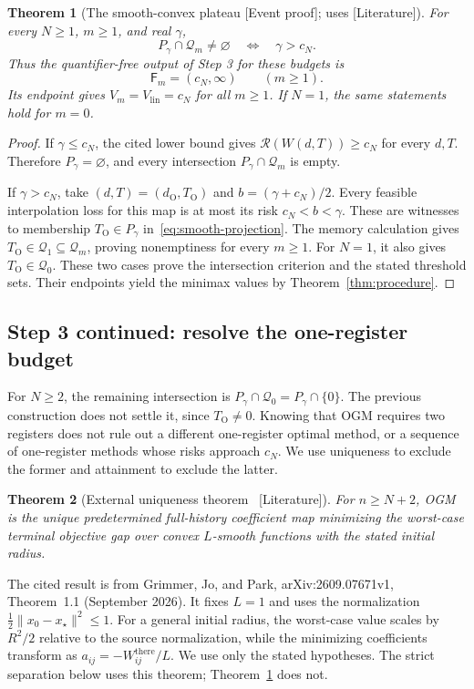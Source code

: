 \documentclass[11pt]{article}
\newcommand{\supportlabel}[1]{\textcolor{blue!60!black}{\small\textsf{[#1]}}}
\newcommand{\eventproof}{\supportlabel{Event proof}}
\newcommand{\literature}{\supportlabel{Literature}}
\numberwithin{equation}{section}
\newtheorem{theorem}{Theorem}[section]
\theoremstyle{definition}
\newcommand{\Q}{\mathcal Q}
\newcommand{\risk}{\mathcal R}
\begin{document}
\begin{theorem}[The smooth-convex plateau \eventproof; uses \literature]\label{thm:smooth-plateau}
For every $N\ge1$, $m\ge1$, and real $\gamma$,
\begin{equation}
 P_\gamma\cap\Q_m\ne\varnothing\quad\Longleftrightarrow\quad\gamma>c_N.
 \label{eq:smooth-intersections}
\end{equation}
Thus the quantifier-free output of Step 3 for these budgets is
\begin{equation}
 \mathsf F_m=(c_N,\infty)\qquad(m\ge1).
 \label{eq:smooth-thresholds}
\end{equation}
Its endpoint gives $V_m=V_{\mathrm{lin}}=c_N$ for all $m\ge1$. If $N=1$, the same statements hold for $m=0$.
\end{theorem}
\begin{proof}
If $\gamma\le c_N$, the cited lower bound gives $\risk(W(d,T))\ge c_N$ for every $d,T$. Therefore $P_\gamma=\varnothing$, and every intersection $P_\gamma\cap\Q_m$ is empty.

If $\gamma>c_N$, take $(d,T)=(d_{\mathrm O},T_{\mathrm O})$ and $b=(\gamma+c_N)/2$. Every feasible interpolation loss for this map is at most its risk $c_N<b<\gamma$. These are witnesses to membership $T_{\mathrm O}\in P_\gamma$ in~\eqref{eq:smooth-projection}. The memory calculation gives $T_{\mathrm O}\in\Q_1\subseteq\Q_m$, proving nonemptiness for every $m\ge1$. For $N=1$, it also gives $T_{\mathrm O}\in\Q_0$. These two cases prove the intersection criterion and the stated threshold sets. Their endpoints yield the minimax values by Theorem~\ref{thm:procedure}.
\end{proof}

\subsection{Step 3 continued: resolve the one-register budget}
For $N\ge2$, the remaining intersection is $P_\gamma\cap\Q_0=P_\gamma\cap\{0\}$. The previous construction does not settle it, since $T_{\mathrm O}\ne0$. Knowing that OGM requires two registers does not rule out a different one-register optimal method, or a sequence of one-register methods whose risks approach $c_N$. We use uniqueness to exclude the former and attainment to exclude the latter.

\begin{theorem}[External uniqueness theorem~{\cite[Theorem 1.1]{GJP}} \literature]\label{thm:uniqueness}
For $n\ge N+2$, OGM is the unique predetermined full-history coefficient map minimizing the worst-case terminal objective gap over convex $L$-smooth functions with the stated initial radius.
\end{theorem}
The cited result is from Grimmer, Jo, and Park, arXiv:2609.07671v1, Theorem~1.1 (September 2026). It fixes $L=1$ and uses the normalization $\tfrac12\|x_0-x_\star\|^2\le1$. For a general initial radius, the worst-case value scales by $R^2/2$ relative to the source normalization, while the minimizing coefficients transform as $a_{ij}=-W^{\mathrm{there}}_{ij}/L$. We use only the stated hypotheses. The strict separation below uses this theorem; Theorem~\ref{thm:smooth-plateau} does not.
\end{document}
